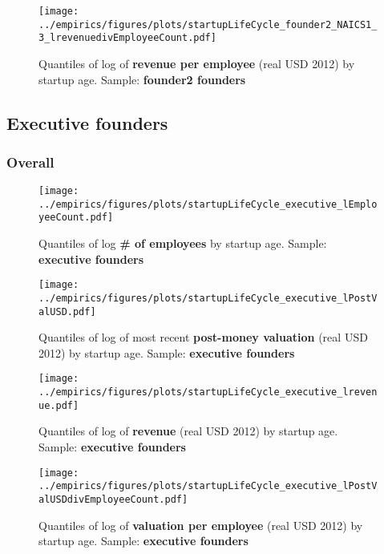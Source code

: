 \documentclass[12pt,english]{article}
\theoremstyle{remark}
\let\Oldsubsection\subsection
\renewcommand{\subsection}{\FloatBarrier\Oldsubsection}
\let\Oldsubsubsection\subsubsection
\renewcommand{\subsubsection}{\FloatBarrier\Oldsubsubsection}
\begin{document}
\begin{figure}[!htb]
	\centering
	\texttt{[image: ../empirics/figures/plots/startupLifeCycle\_founder2\_NAICS1\_3\_lrevenuedivEmployeeCount.pdf]}
	\caption{Quantiles of log of \textbf{revenue per employee} (real USD 2012) by startup age. 
		Sample: \textbf{founder2 founders}}
\end{figure}









\subsection{Executive founders}

\subsubsection{Overall}

\begin{figure}[!htb]
	\centering
	\texttt{[image: ../empirics/figures/plots/startupLifeCycle\_executive\_lEmployeeCount.pdf]}
	\caption{Quantiles of log \textbf{\# of employees} by startup age. 
		Sample: \textbf{executive founders}}
\end{figure}

\begin{figure}[!htb]
	\centering
	\texttt{[image: ../empirics/figures/plots/startupLifeCycle\_executive\_lPostValUSD.pdf]}
	\caption{Quantiles of log of most recent \textbf{post-money valuation} (real USD 2012) by startup age. 
		Sample: \textbf{executive founders}}
\end{figure}

\begin{figure}[!htb]
	\centering
	\texttt{[image: ../empirics/figures/plots/startupLifeCycle\_executive\_lrevenue.pdf]}
	\caption{Quantiles of log of \textbf{revenue} (real USD 2012) by startup age. 
		Sample: \textbf{executive founders}}
\end{figure}

\begin{figure}[!htb]
	\centering
	\texttt{[image: ../empirics/figures/plots/startupLifeCycle\_executive\_lPostValUSDdivEmployeeCount.pdf]}
	\caption{Quantiles of log of \textbf{valuation per employee} (real USD 2012) by startup age. 
		Sample: \textbf{executive founders}}
\end{figure}
\end{document}
